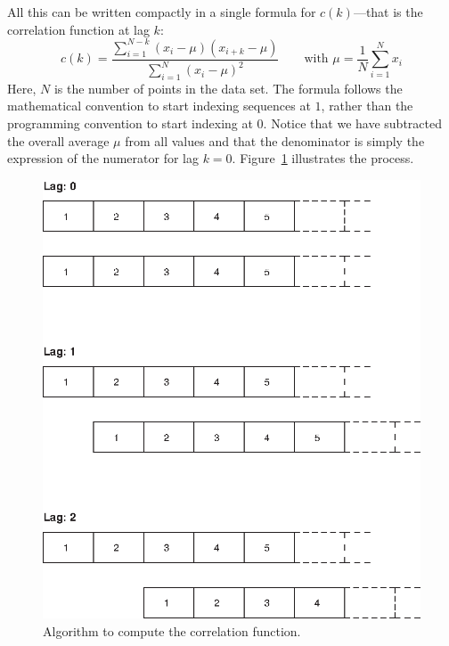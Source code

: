 All this can be written compactly in a single formula for $c(k)$---that
is the correlation function at lag $k$:
%
\[
c(k) = \frac{\sum\limits_{i=1}^{N-k} (x_i - \mu)(x_{i+k} - \mu)}
            {\sum\limits_{i=1}^N (x_i - \mu)^2}
\qquad \text{with } \mu = \frac{1}{N} \sum_{i=1}^N x_i
\]
%
Here, $N$ is the number of points in the data set. The formula follows
the mathematical convention to start indexing sequences at $1$,
rather than the programming convention to start indexing at $0$.
Notice that we  have subtracted the overall average $\mu$ from all
values and that the denominator is simply the expression of the
numerator for lag $k=0$. Figure~\ref{fig:correlationlags} illustrates
the process.


\begin{figure}
 \includegraphics[scale=0.8]{img/correlationlags}
 \caption{Algorithm to compute the correlation function.}
 \label{fig:correlationlags}\vspace*{15pt}
\end{figure}

